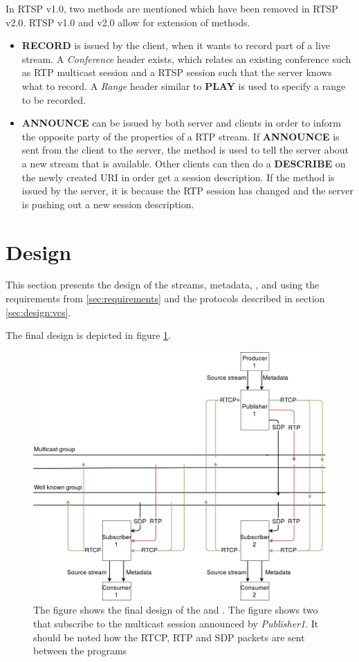 In RTSP v1.0\citep{RFC2326}, two methods are mentioned which have been removed in RTSP v2.0. RTSP v1.0 and v2.0 allow for extension of methods.
\begin{itemize}
	\item \textbf{RECORD} is issued by the client, when it wants to record part of a live stream. A \textit{Conference} header exists, which relates an existing conference such as RTP multicast session and a RTSP session such that the server knows what to record. A \textit{Range} header similar to \textbf{PLAY} is used to specify a range to be recorded.
	\item \textbf{ANNOUNCE} can be issued by both server and clients in order to inform the opposite party of the properties of a RTP stream. If \textbf{ANNOUNCE} is sent from the client to the server, the method is used to tell the server about a new stream that is available. Other clients can then do a \textbf{DESCRIBE} on the newly created URI in order get a session description. If the method is issued by the server, it is because the RTP session has changed and the server is pushing out a new session description.
\end{itemize}


\section{Design}
This section presents the design of the streams, metadata, , \sub{} and  using the requirements from \ref{sec:requirements} and the protocols described in section \ref{sec:design:vcs}. 

The final design is depicted in figure \ref{fig:design:overall}.
\begin{figure}[H]
	\centering
	\includegraphics[width=\textwidth]{figures/design_overall.png}
	\caption{The figure shows the final design of the \pubs{} and \subs{}. The figure shows two \pubs{} that  subscribe to the multicast session announced by \textit{Publisher1}. It should be noted how the RTCP, RTP and SDP packets are sent between the programs} \label{fig:design:overall}
\end{figure}

